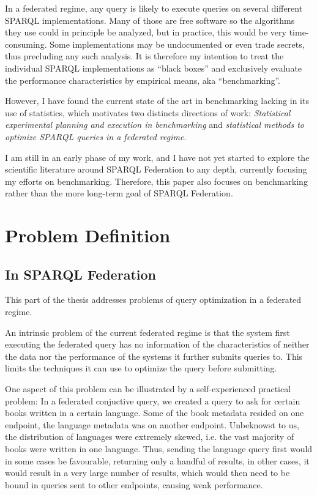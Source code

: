 \documentclass{llncs}
\begin{document}
In a federated regime, any query is likely to execute queries on
several different SPARQL implementations. Many of those are free
software so the algorithms they use could in principle be analyzed,
but in practice, this would be very time-consuming. Some
implementations may be undocumented or even trade secrets, thus
precluding any such analysis. It is therefore my intention to treat
the individual SPARQL implementations as ``black boxes'' and
exclusively evaluate the performance characteristics by empirical
means, aka ``benchmarking''.

However, I have found the current state of the art in benchmarking
lacking in its use of statistics, which motivates two distincts
directions of work: \emph{Statistical experimental planning and execution in
benchmarking} and \emph{statistical methods to optimize SPARQL queries
in a federated regime}.

I am still in an early phase of my work, and I have not yet started to
explore the scientific literature around SPARQL Federation to any
depth, currently focusing my efforts on benchmarking. Therefore, this
paper also focuses on benchmarking rather than the more long-term goal
of SPARQL Federation.

\section{Problem Definition}

\subsection{In SPARQL Federation}

This part of the thesis addresses problems of query optimization in a
federated regime.

An intrinsic problem of the current federated regime is that the
system first executing the federated query has no information of the
characteristics of neither the data nor the performance of the systems
it further submits queries to. This limits the techniques it can use
to optimize the query before submitting.

One aspect of this problem can be illustrated by a self-experienced
practical problem: In a federated conjuctive query, we created a query
to ask for certain books written in a certain
language. Some of the book metadata resided on one endpoint, the
language metadata was on another endpoint. Unbeknowst to us, the
distribution of languages were extremely skewed, i.e. the vast
majority of books were written in one language. Thus, sending the
language query first would in some cases be favourable, returning only
a handful of results, in other cases, it would result in a very large
number of results, which would then need to be bound in queries sent
to other endpoints, causing weak performance.
\end{document}
